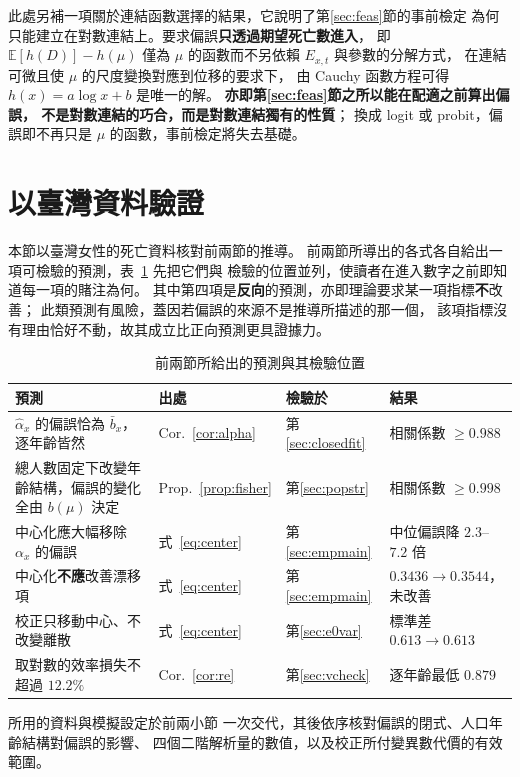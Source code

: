 \documentclass[UTF8, fontset=macnew, a4paper, 12pt]{ctexart}
\newcommand{\Ex}{\mathbb{E}}
\begin{document}
此處另補一項關於連結函數選擇的結果，它說明了第\ref{sec:feas}節的事前檢定
為何只能建立在對數連結上。要求偏誤\textbf{只透過期望死亡數進入}，
即 $\Ex[h(D)]-h(\mu)$ 僅為 $\mu$ 的函數而不另依賴 $E_{x,t}$ 與參數的分解方式，
在連結可微且使 $\mu$ 的尺度變換對應到位移的要求下，
由 Cauchy 函數方程可得 $h(x)=a\log x+b$ 是唯一的解。
\textbf{亦即第\ref{sec:feas}節之所以能在配適之前算出偏誤，
不是對數連結的巧合，而是對數連結獨有的性質}；
換成 logit 或 probit，偏誤即不再只是 $\mu$ 的函數，事前檢定將失去基礎。

\section{以臺灣資料驗證}\label{sec:valid}

本節以臺灣女性的死亡資料核對前兩節的推導。
前兩節所導出的各式各自給出一項可檢驗的預測，表~\ref{tab:pred} 先把它們與
檢驗的位置並列，使讀者在進入數字之前即知道每一項的賭注為何。
其中第四項是\textbf{反向}的預測，亦即理論要求某一項指標\textbf{不}改善；
此類預測有風險，蓋因若偏誤的來源不是推導所描述的那一個，
該項指標沒有理由恰好不動，故其成立比正向預測更具證據力。

\begin{table}[H]
\centering
\caption{前兩節所給出的預測與其檢驗位置}
\footnotesize
\begin{tabular}{llll}
\toprule
預測 & 出處 & 檢驗於 & 結果\\
\midrule
$\hat\alpha_x$ 的偏誤恰為 $\bar b_x$，逐年齡皆然
  & Cor.~\ref{cor:alpha} & 第\ref{sec:closedfit} & 相關係數 $\ge0.988$\\
總人數固定下改變年齡結構，偏誤的變化全由 $b(\mu)$ 決定
  & Prop.~\ref{prop:fisher} & 第\ref{sec:popstr} & 相關係數 $\ge0.998$\\
中心化應大幅移除 $\alpha_x$ 的偏誤
  & 式~\eqref{eq:center} & 第\ref{sec:empmain} & 中位偏誤降 $2.3$--$7.2$ 倍\\
中心化\textbf{不應}改善漂移項
  & 式~\eqref{eq:center} & 第\ref{sec:empmain} & $0.3436\to0.3544$，未改善\\
校正只移動中心、不改變離散
  & 式~\eqref{eq:center} & 第\ref{sec:e0var} & 標準差 $0.613\to0.613$\\
取對數的效率損失不超過 $12.2\%$
  & Cor.~\ref{cor:re} & 第\ref{sec:vcheck} & 逐年齡最低 $0.879$\\
\bottomrule
\end{tabular}
\label{tab:pred}
\end{table}

所用的資料與模擬設定於前兩小節
一次交代，其後依序核對偏誤的閉式、人口年齡結構對偏誤的影響、
四個二階解析量的數值，以及校正所付變異數代價的有效範圍。
\end{document}
